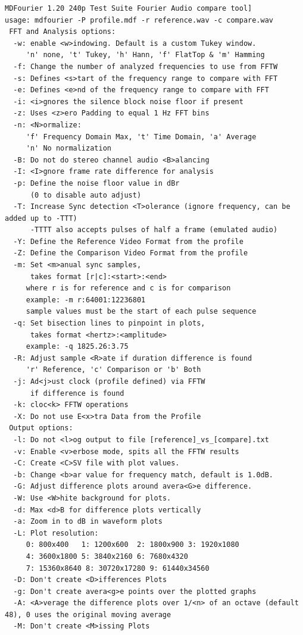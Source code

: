 \documentclass[10pt,a4paper]{report}
\begin{document}
\begin{appendices}
\begin{verbatim}
MDFourier 1.20 240p Test Suite Fourier Audio compare tool]
usage: mdfourier -P profile.mdf -r reference.wav -c compare.wav
 FFT and Analysis options:
  -w: enable <w>indowing. Default is a custom Tukey window.
     'n' none, 't' Tukey, 'h' Hann, 'f' FlatTop & 'm' Hamming
  -f: Change the number of analyzed frequencies to use from FFTW
  -s: Defines <s>tart of the frequency range to compare with FFT
  -e: Defines <e>nd of the frequency range to compare with FFT
  -i: <i>gnores the silence block noise floor if present
  -z: Uses <z>ero Padding to equal 1 Hz FFT bins
  -n: <N>ormalize:
     'f' Frequency Domain Max, 't' Time Domain, 'a' Average
     'n' No normalization
  -B: Do not do stereo channel audio <B>alancing
  -I: <I>gnore frame rate difference for analysis
  -p: Define the noise floor value in dBr
      (0 to disable auto adjust)
  -T: Increase Sync detection <T>olerance (ignore frequency, can be added up to -TTT)
      -TTTT also accepts pulses of half a frame (emulated audio)
  -Y: Define the Reference Video Format from the profile
  -Z: Define the Comparison Video Format from the profile
  -m: Set <m>anual sync samples,
      takes format [r|c]:<start>:<end>
     where r is for reference and c is for comparison
     example: -m r:64001:12236801
     sample values must be the start of each pulse sequence
  -q: Set bisection lines to pinpoint in plots,
      takes format <hertz>:<amplitude>
     example: -q 1825.26:3.75
  -R: Adjust sample <R>ate if duration difference is found
     'r' Reference, 'c' Comparison or 'b' Both
  -j: Ad<j>ust clock (profile defined) via FFTW
      if difference is found
  -k: cloc<k> FFTW operations
  -X: Do not use E<x>tra Data from the Profile
 Output options:
  -l: Do not <l>og output to file [reference]_vs_[compare].txt
  -v: Enable <v>erbose mode, spits all the FFTW results
  -C: Create <C>SV file with plot values.
  -b: Change <b>ar value for frequency match, default is 1.0dB.
  -G: Adjust difference plots around avera<G>e difference.
  -W: Use <W>hite background for plots.
  -d: Max <d>B for difference plots vertically
  -a: Zoom in to dB in waveform plots
  -L: Plot resolution:
     0: 800x400   1: 1200x600  2: 1800x900 3: 1920x1080
     4: 3600x1800 5: 3840x2160 6: 7680x4320
     7: 15360x8640 8: 30720x17280 9: 61440x34560
  -D: Don't create <D>ifferences Plots
  -g: Don't create avera<g>e points over the plotted graphs
  -A: <A>verage the difference plots over 1/<n> of an octave (default 48), 0 uses the original moving average
  -M: Don't create <M>issing Plots

\end{verbatim}
\end{appendices}
\end{document}
